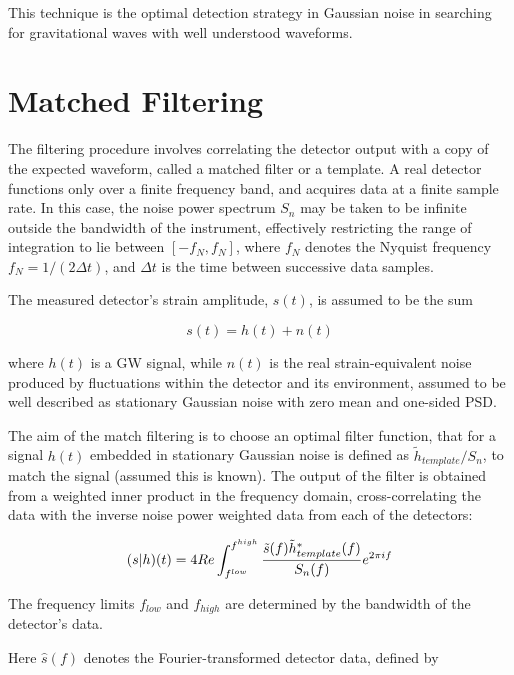 \documentclass[binding=0.6cm, LaM]{sapthesis}
\begin{document}
	This technique is the optimal detection strategy in Gaussian noise 
	in searching for gravitational waves with well understood waveforms. \cite[p. 2] {bar} \cite[p. 2] {bar}


\section{Matched Filtering}

	The filtering procedure involves correlating the detector output 
	with a copy of the expected waveform, 
	called a matched filter or a template.
	A real detector functions only over a finite frequency band, 
	and acquires data at a finite sample rate. 
	In this case, the noise power spectrum $S_n$ 
	may be taken to be infinite outside the bandwidth of the instrument, 
	effectively restricting the range of integration to lie between $[-f_N, f_N]$, 
	where $f_N$ denotes the Nyquist frequency $f_N = 1/(2\Delta t)$, 
	and $\Delta t$ is the time between successive data samples.   \cite[p. 2] {bar}

	The measured detector’s strain amplitude, $s(t)$, 
	is assumed to be the sum

		\begin{equation}
			s(t) = h(t) + n(t)
		\end{equation}

	where $h(t)$ is a GW signal, while $n(t)$ is the real strain-equivalent noise 
	produced by fluctuations within the detector and its environment, 
        assumed to be well described as stationary Gaussian noise with zero mean and one-sided PSD. 

	The aim of the match filtering is to choose an optimal filter function, 
	that for a signal $h(t)$ embedded in stationary Gaussian noise is defined as 
	$\tilde h_{template}/S_n$, to match the signal (assumed this is known). \cite[p. 2]{bar}
	The output of the filter is obtained from a weighted inner product in the frequency domain, 
	cross-correlating the data with the inverse noise power weighted data from each of the detectors:

		\begin{equation}
 			(s|h)(t) = 4Re \int^{f^{high}}_{f^{low}} {{\tilde s (f) \tilde h^{*}_{template}(f)} \over {S_n (f)}} e^{2 \pi if} 
		\end{equation}

	The frequency limits $f_{low}$ and $f_{high}$ are determined by the bandwidth of the detector’s data.

	Here $\hat s(f)$ denotes the Fourier-transformed detector data, defined by
\end{document}

